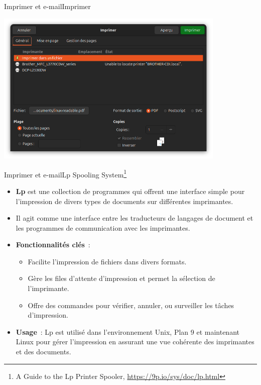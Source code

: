 \documentclass{beamer}
\begin{document}
    \begin{frame}{Imprimer et e-mail}{Imprimer}
        \begin{center}
            \includegraphics[width=11cm]{image/print-configuration}
        \end{center}
    \end{frame}

    \begin{frame}{Imprimer et e-mail}{Lp Spooling System\footnote{A Guide to the Lp Printer Spooler, \url{https://9p.io/sys/doc/lp.html}}}
        \begin{itemize}
            \item \textbf{Lp} est une collection de programmes qui offrent une interface simple pour l'impression de divers types de documents sur différentes imprimantes.
            \item Il agit comme une interface entre les traducteurs de langages de document et les programmes de communication avec les imprimantes.
            \item \textbf{Fonctionnalités clés}~:
            \begin{itemize}
                \item Facilite l'impression de fichiers dans divers formats.
                \item Gère les files d'attente d'impression et permet la sélection de l'imprimante.
                \item Offre des commandes pour vérifier, annuler, ou surveiller les tâches d'impression.
            \end{itemize}
            \item \textbf{Usage}~: Lp est utilisé dans l'environnement Unix, Plan 9 et maintenant Linux pour gérer l'impression en assurant une vue cohérente des imprimantes et des documents.
        \end{itemize}
    \end{frame}
\end{document}
